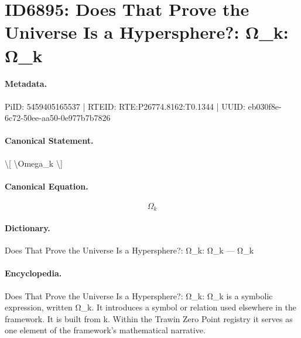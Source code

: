 \section*{ID6895: Does That Prove the Universe Is a Hypersphere?: Ω\_k: Ω\_k}
\paragraph{Metadata.}
PiID: 5459405165537 | RTEID: RTE:P26774.8162:T0.1344 | UUID: eb030f8e-6c72-50ee-aa50-0e977b7b7826

\paragraph{Canonical Statement.}
\textbackslash{}[ \textbackslash{}Omega\_k \textbackslash{}]

\paragraph{Canonical Equation.}
\[
\Omega_k
\]

\paragraph{Dictionary.}
Does That Prove the Universe Is a Hypersphere?: Ω\_k: Ω\_k — Ω\_k

\paragraph{Encyclopedia.}
Does That Prove the Universe Is a Hypersphere?: Ω\_k: Ω\_k is a symbolic expression, written Ω\_k. It introduces a symbol or relation used elsewhere in the framework. It is built from k. Within the Trawin Zero Point registry it serves as one element of the framework's mathematical narrative.
